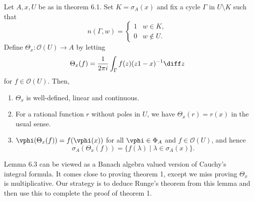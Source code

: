 \documentclass[12pt]{article}
\begin{document}
\begin{theorem}
	Let $A, x, U$ be as in theorem 6.1. Set $K = \sigma_A(x)$ and fix a cycle $\Gamma$ in $U \setminus K$ such that
	\[
	n(\Gamma, w) =
	\begin{cases}
		1 & w \in K, \\
		0 & w \not \in U.
	\end{cases}
	\]
	Define $\Theta_x : \mathcal{O}(U) \to A$ by letting
	\[
		\Theta_x(f) = \frac 1{2 \pi i} \int_\Gamma f(z)(z 1 - x)^{-1} \diff z
	\]
	for $f \in \mathcal{O}(U)$. Then,
	\begin{enumerate}[\normalfont(i)]
		\item $\Theta_x$ is well-defined, linear and continuous.
		\item For a rational function $r$ without poles in $U$, we have $\Theta_x(r) = r(x)$ in the usual sense.
		\item $\vphi(\Theta_x(f)) = f(\vphi(x))$ for all $\vphi \in \Phi_A$ and $f \in \mathcal{O}(U)$, and hence
			\[
				\sigma_A(\Theta_x(f)) = \{f(\lambda) \mid \lambda \in \sigma_A(x)\}.
			\]
	\end{enumerate}	
\end{theorem}

\begin{remark}
	Lemma 6.3 can be viewed as a Banach algebra valued version of Cauchy's integral formula. It comes close to proving theorem 1, except we miss proving $\Theta_x$ is multiplicative. Our strategy is to deduce Runge's theorem from this lemma and then use this to complete the proof of theorem 1.
\end{remark}

\end{document}
